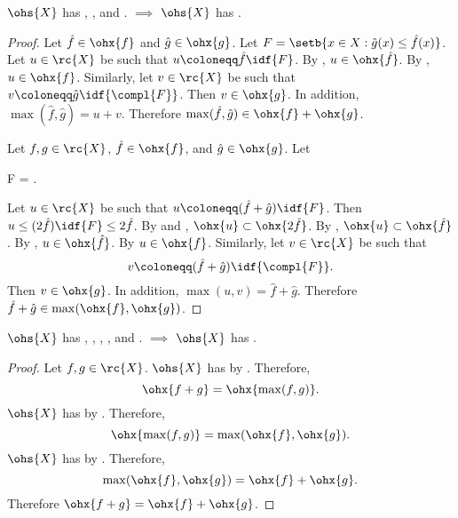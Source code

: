\documentclass[b5paper, english, oneside]{memoir}
\begin{document}
\begin{theorem}
\label{MaximumSumIsImplied}
$\ohs{X}$ has , , and . $\implies$ $\ohs{X}$ has .
\end{theorem}

\begin{proof}
\proofpart{$\subset$}
Let $\hat{f} \in \ohx{f}$ and $\hat{g} \in \ohx{g}$. Let $F = \setb{x \in X: \hat{g}(x) \leq \hat{f}(x)}$. Let $u \in \rc{X}$ be such that $u \coloneqq \hat{f} \idf{F}$. By , $u \in \ohx{\hat{f}}$. By , $u \in \ohx{f}$. Similarly, let $v \in \rc{X}$ be such that $v \coloneqq \hat{g} \idf{\compl{F}}$. Then $v \in \ohx{g}$. In addition, $\max(\hat{f}, \hat{g}) = u + v$. Therefore $\max(\hat{f}, \hat{g}) \in \ohx{f} + \ohx{g}$.

\proofpart{$\supset$} 
Let $f, g \in \rc{X}$, $\hat{f} \in \ohx{f}$, and $\hat{g} \in \ohx{g}$. Let
\begin{eqs}
F = . 
\end{eqs}
Let $u \in \rc{X}$ be such that $u \coloneqq (\hat{f} + \hat{g}) \idf{F}$. Then $u \leq (2 \hat{f}) \idf{F} \leq 2 \hat{f}$. By  and , $\ohx{u} \subset \ohx{2 \hat{f}}$. By , $\ohx{u} \subset \ohx{\hat{f}}$. By , $u \in \ohx{\hat{f}}$. By  $u \in \ohx{f}$. Similarly, let $v \in \rc{X}$ be such that
\begin{equation}
v \coloneqq (\hat{f} + \hat{g}) \idf{\compl{F}}.
\end{equation}
Then $v \in \ohx{g}$. In addition, $\max(u, v) = \hat{f} + \hat{g}$. Therefore $\hat{f} + \hat{g} \in \max(\ohx{f}, \ohx{g})$.

\end{proof}

\begin{theorem}
\label{AdditivityIsImplied}
$\ohs{X}$ has , , , , and . $\implies$ $\ohs{X}$ has .
\end{theorem}

\begin{proof}
Let $f, g \in \rc{X}$. $\ohs{X}$ has  by . Therefore, 
\begin{equation}
\ohx{f + g} = \ohx{\max(f, g)}.
\end{equation}
$\ohs{X}$ has  by . Therefore, 
\begin{equation}
\ohx{\max(f, g)} = \max(\ohx{f}, \ohx{g}).  
\end{equation}
$\ohs{X}$ has  by . Therefore, 
\begin{equation}
\max(\ohx{f}, \ohx{g}) = \ohx{f} + \ohx{g}.   
\end{equation}
Therefore $\ohx{f + g} = \ohx{f} + \ohx{g}$.

\end{proof}
\end{document}
